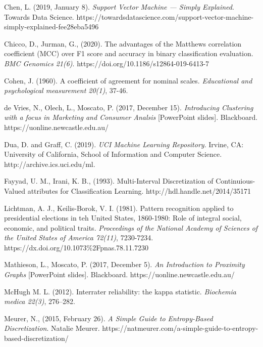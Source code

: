 \documentclass[11pt, a4paper]{article}
\begin{document}
\begin{thebibliography}{18}

Chen, L. (2019, January 8). \emph{Support Vector Machine — Simply Explained}. Towards Data Science. https://towardsdatascience.com/support-vector-machine-simply-explained-fee28eba5496

Chicco, D., Jurman, G., (2020). The advantages of the Matthews correlation coefficient (MCC) over F1 score and accuracy in binary classification evaluation. \emph{BMC Genomics 21(6)}. https://doi.org/10.1186/s12864-019-6413-7

Cohen, J. (1960). A coefficient of agreement for nominal scales. \emph{Educational and psychological measurement 20(1)}, 37-46.

de Vries, N., Olech, L., Moscato, P. (2017, December 15). \emph{Introducing Clustering with a focus in Marketing and Consumer Analsis} [PowerPoint slides]. Blackboard. https://uonline.newcastle.edu.au/

Dua, D. and Graff, C. (2019). \emph{UCI Machine Learning Repository}. Irvine, CA: University of California, School of Information and Computer Science.  http://archive.ics.uci.edu/ml.

Fayyad, U. M., Irani, K. B., (1993). Multi-Interval Discretization of Continuious-Valued attributes for Classification Learning. http://hdl.handle.net/2014/35171

Lichtman, A. J., Keilis-Borok, V. I. (1981). Pattern recognition applied to presidential elections in teh United States, 1860-1980: Role of integral social, economic, and political traits. \emph{Proceedings of the National Academy of Sciences of the United States of America 72(11)}, 7230-7234. https://dx.doi.org/10.1073\%2Fpnas.78.11.7230

Mathieson, L., Moscato, P. (2017, December 5). \emph{An Introduction to Proximity Graphs} [PowerPoint slides]. Blackboard. https://uonline.newcastle.edu.au/

McHugh M. L. (2012). Interrater reliability: the kappa statistic. \emph{Biochemia medica 22(3)}, 276–282.

Meurer, N., (2015, February 26). \emph{A Simple Guide to Entropy-Based Discretization}. Natalie Meurer. https://natmeurer.com/a-simple-guide-to-entropy-based-discretization/


\end{thebibliography}
\end{document}
